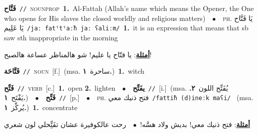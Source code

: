 \documentclass[10pt,a4paper,twoside]{article} %
\begin{document}
\begin{multicols}{2}
{{{\setlength\topsep{0pt}\textbf{\foreignlanguage{arabic}{فَتَّاح}}\ {\color{gray}\texttt{//}\color{black}}\ \textsc{noun\textunderscore prop}\ \textbf{1.}~Al-Fattah (Allah's name which means the Opener, the One who opens for His slaves the closed worldly and religious matters)\ \ $\bullet$\ \ \textsc{ph.} \color{gray} \foreignlanguage{arabic}{يَا فَتَّاح يَا عَلِيم}\color{black}\ {\color{gray}\texttt{/{\sffamily jaː fatˤtˤaːħ jaː ʕaliːm}/}\color{black}}\ \textbf{1.}~it is an expression that means that sb saw sth inappropriate in the morning\  \begin{flushright}\color{gray}\foreignlanguage{arabic}{\textbf{\underline{\foreignlanguage{arabic}{أمثلة}}}: يا فتّاح يا عليم! شو هالمناظر عساعة هالصبح!}\end{flushright}\color{black}} \vspace{2mm}

{\setlength\topsep{0pt}\textbf{\foreignlanguage{arabic}{فَتَّاحَة}}\ {\color{gray}\texttt{//}\color{black}}\ \textsc{noun}\ [f.]\ \color{gray}(msa. \foreignlanguage{arabic}{ساحرة}~\foreignlanguage{arabic}{\textbf{١.}})\color{black}\ \textbf{1.}~witch\ 

{\setlength\topsep{0pt}\textbf{\foreignlanguage{arabic}{فَتِّح}}\ {\color{gray}\texttt{//}\color{black}}\ \textsc{verb}\ [c.]\ \textbf{1.}~open  \textbf{2.}~lighten\ \ $\bullet$\ \ \setlength\topsep{0pt}\textbf{\foreignlanguage{arabic}{يفَتِّح}}\ {\color{gray}\texttt{//}\color{black}}\ [i.]\ \color{gray}(msa. \foreignlanguage{arabic}{يُفَتِّح اللون}~\foreignlanguage{arabic}{\textbf{٢.}}  \foreignlanguage{arabic}{يَفْتَح}~\foreignlanguage{arabic}{\textbf{١.}})\color{black}\ \ $\bullet$\ \ \setlength\topsep{0pt}\textbf{\foreignlanguage{arabic}{فَتِّح}}\ {\color{gray}\texttt{//}\color{black}}\ [p.]\ \ $\bullet$\ \ \textsc{ph.} \color{gray} \foreignlanguage{arabic}{فتح ذنيك معي}\color{black}\ {\color{gray}\texttt{/{\sffamily fattiħ (d)ineːk maʕi}/}\color{black}}\ \color{gray} (msa. \foreignlanguage{arabic}{يُركِّز}~\foreignlanguage{arabic}{\textbf{١.}})\color{black}\ \textbf{1.}~concentrate\  \begin{flushright}\color{gray}\foreignlanguage{arabic}{\textbf{\underline{\foreignlanguage{arabic}{أمثلة}}}: فتح ذنيك معي! بديش ولاد هسَّه!\ $\bullet$\ \  رحت عالكوفيرة عشان تفَتِِّحلي لون شعري}\end{flushright}\color{black}} \vspace{2mm}

}}}
\end{multicols}
\end{document}
